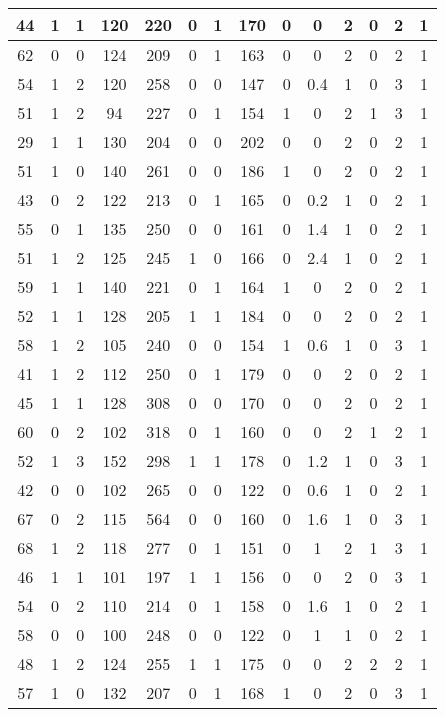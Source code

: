 \documentclass{article}
\begin{document}
\begin{longtable}{|c|c|c|c|c|c|c|c|c|c|c|c|c|c|}
\hline
44 & 1 & 1 & 120 & 220 & 0 & 1 & 170 & 0 & 0 & 2 & 0 & 2 & 1\\
\hline
62 & 0 & 0 & 124 & 209 & 0 & 1 & 163 & 0 & 0 & 2 & 0 & 2 & 1\\
\hline
54 & 1 & 2 & 120 & 258 & 0 & 0 & 147 & 0 & 0.4 & 1 & 0 & 3 & 1\\
\hline
51 & 1 & 2 & 94 & 227 & 0 & 1 & 154 & 1 & 0 & 2 & 1 & 3 & 1\\
\hline
29 & 1 & 1 & 130 & 204 & 0 & 0 & 202 & 0 & 0 & 2 & 0 & 2 & 1\\
\hline
51 & 1 & 0 & 140 & 261 & 0 & 0 & 186 & 1 & 0 & 2 & 0 & 2 & 1\\
\hline
43 & 0 & 2 & 122 & 213 & 0 & 1 & 165 & 0 & 0.2 & 1 & 0 & 2 & 1\\
\hline
55 & 0 & 1 & 135 & 250 & 0 & 0 & 161 & 0 & 1.4 & 1 & 0 & 2 & 1\\
\hline
51 & 1 & 2 & 125 & 245 & 1 & 0 & 166 & 0 & 2.4 & 1 & 0 & 2 & 1\\
\hline
59 & 1 & 1 & 140 & 221 & 0 & 1 & 164 & 1 & 0 & 2 & 0 & 2 & 1\\
\hline
52 & 1 & 1 & 128 & 205 & 1 & 1 & 184 & 0 & 0 & 2 & 0 & 2 & 1\\
\hline
58 & 1 & 2 & 105 & 240 & 0 & 0 & 154 & 1 & 0.6 & 1 & 0 & 3 & 1\\
\hline
41 & 1 & 2 & 112 & 250 & 0 & 1 & 179 & 0 & 0 & 2 & 0 & 2 & 1\\
\hline
45 & 1 & 1 & 128 & 308 & 0 & 0 & 170 & 0 & 0 & 2 & 0 & 2 & 1\\
\hline
60 & 0 & 2 & 102 & 318 & 0 & 1 & 160 & 0 & 0 & 2 & 1 & 2 & 1\\
\hline
52 & 1 & 3 & 152 & 298 & 1 & 1 & 178 & 0 & 1.2 & 1 & 0 & 3 & 1\\
\hline
42 & 0 & 0 & 102 & 265 & 0 & 0 & 122 & 0 & 0.6 & 1 & 0 & 2 & 1\\
\hline
67 & 0 & 2 & 115 & 564 & 0 & 0 & 160 & 0 & 1.6 & 1 & 0 & 3 & 1\\
\hline
68 & 1 & 2 & 118 & 277 & 0 & 1 & 151 & 0 & 1 & 2 & 1 & 3 & 1\\
\hline
46 & 1 & 1 & 101 & 197 & 1 & 1 & 156 & 0 & 0 & 2 & 0 & 3 & 1\\
\hline
54 & 0 & 2 & 110 & 214 & 0 & 1 & 158 & 0 & 1.6 & 1 & 0 & 2 & 1\\
\hline
58 & 0 & 0 & 100 & 248 & 0 & 0 & 122 & 0 & 1 & 1 & 0 & 2 & 1\\
\hline
48 & 1 & 2 & 124 & 255 & 1 & 1 & 175 & 0 & 0 & 2 & 2 & 2 & 1\\
\hline
57 & 1 & 0 & 132 & 207 & 0 & 1 & 168 & 1 & 0 & 2 & 0 & 3 & 1\\

\end{longtable}
\end{document}
